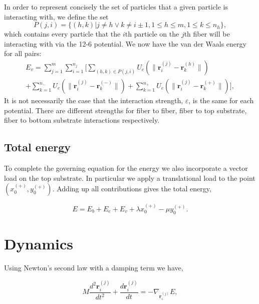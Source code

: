 	In order to represent concisely the set of particles that a given particle is interacting with, we define the set
\begin{equation}
	P(j,i) = \{ (h,k)|j \neq h \vee k \neq i \pm 1, 1 \leq h \leq m, 1 \leq k \leq n_h \},
\end{equation}
which contains every particle that the $i$th particle on the $j$th fiber will be interacting with via the 12-6 potential. We now have the van der Waals energy for all pairs:
\begin{multline}
	E_v = \sum_{j=1}^m \sum_{i=1}^{n_j} \bigg[ \sum_{(h,k) \in P(j,i)} U_c \left( \| \textbf{r}_i^{(j)} - \textbf{r}_k^{(h)} \| \right) \\ + \sum_{k=1}^{n_-} U_c \left( \| \textbf{r}_i^{(j)} - \textbf{r}_k^{(-)} \| \right) + \sum_{k=1}^{n_+} U_c \left( \| \textbf{r}_i^{(j)} - \textbf{r}_k^{(+)} \| \right) \bigg],
\end{multline}
It is not necessarily the case that the interaction strength, $\varepsilon$, is the same for each potential. There are different strengths for fiber to fiber, fiber to top substrate, fiber to bottom substrate interactions respectively.


\subsection{Total energy}

To complete the governing equation for the energy we also incorporate a vector load on the top substrate. In particular we apply a translational load to the point $(x_0^{(+)},y_0^{(+)})$. Adding up all contributions gives the total energy, 

\begin{equation}
	E = E_b + E_e + E_v + \lambda x_0^{(+)} - \mu y_0^{(+)}.
\end{equation}

\section{Dynamics}

Using Newton's second law with a damping term we have,

\begin{equation}
	M\frac{d^2\textbf{r}_i^{(j)}}{dt^2} + \frac{d\textbf{r}_i^{(j)}}{dt} = -\nabla_{\textbf{r}_i^{(j)}}E,
\end{equation}

